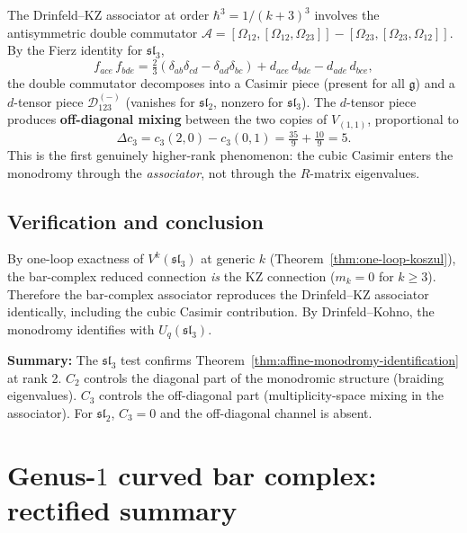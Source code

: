 \documentclass[11pt]{article}
\newcommand{\cD}{\mathcal{D}}
\newcommand{\fg}{\mathfrak{g}}
\newcommand{\fsl}{\mathfrak{sl}}
\begin{document}
The Drinfeld--KZ associator at order $\hbar^3 = 1/(k+3)^3$
involves the antisymmetric double commutator
$\mathscr{A} = [\Omega_{12}, [\Omega_{12}, \Omega_{23}]]
- [\Omega_{23}, [\Omega_{23}, \Omega_{12}]]$.
By the Fierz identity for $\fsl_3$,
\[
  f_{ace}\,f_{bde}
  = \tfrac{2}{3}(\delta_{ab}\delta_{cd} - \delta_{ad}\delta_{bc})
  + d_{ace}\,d_{bde} - d_{ade}\,d_{bce},
\]
the double commutator decomposes into a Casimir piece
(present for all $\fg$) and a $d$-tensor piece
$\cD_{123}^{(-)}$ (vanishes for $\fsl_2$, nonzero for $\fsl_3$).
The $d$-tensor piece produces \textbf{off-diagonal mixing}
between the two copies of $V_{(1,1)}$, proportional to
\[
  \Delta c_3 = c_3(2,0) - c_3(0,1)
  = \tfrac{35}{9} + \tfrac{10}{9} = 5.
\]
This is the first genuinely higher-rank phenomenon:
the cubic Casimir enters the monodromy through the
\emph{associator}, not through the $R$-matrix eigenvalues.

\subsection*{Verification and conclusion}
By one-loop exactness of $V^k(\fsl_3)$ at generic $k$
(Theorem~\ref{thm:one-loop-koszul}), the bar-complex reduced
connection \emph{is} the KZ connection ($m_k = 0$ for $k \geq 3$).
Therefore the bar-complex associator reproduces the Drinfeld--KZ
associator identically, including the cubic Casimir contribution.
By Drinfeld--Kohno, the monodromy identifies with $U_q(\fsl_3)$.

\textbf{Summary:}  The $\fsl_3$ test confirms
Theorem~\ref{thm:affine-monodromy-identification} at rank 2.
$C_2$ controls the diagonal part of the monodromic structure
(braiding eigenvalues).  $C_3$ controls the off-diagonal part
(multiplicity-space mixing in the associator).  For $\fsl_2$,
$C_3 = 0$ and the off-diagonal channel is absent.


\section{Genus-$1$ curved bar complex: rectified summary}
\label{sec:genus1-bar-rectified}
%
\end{document}
